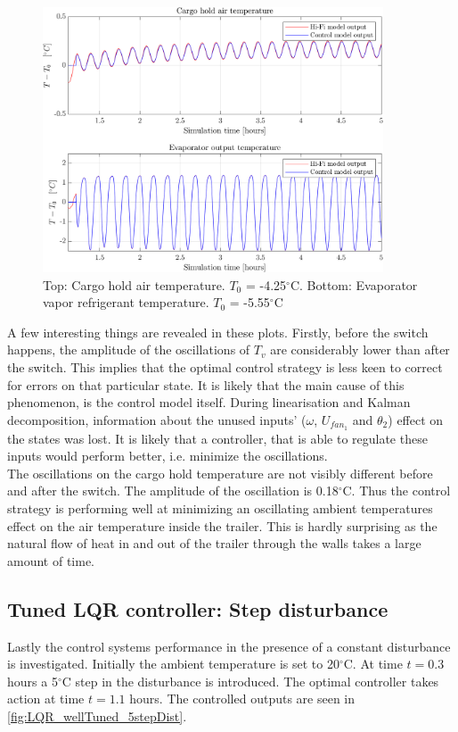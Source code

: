 \begin{figure}[h!]
	\centering
	\includegraphics[width=0.9\textwidth]{Graphics/fig_LQR_wellTuned_sineDist_zoom.png}
	\caption{Top: Cargo hold air temperature. $T_0$ = -4.25$^{\circ}$C. Bottom: Evaporator vapor refrigerant temperature. $T_0$ = -5.55$^{\circ}$C}
	\label{fig:LQR_wellTuned_sineDist_zoom}
\end{figure}

A few interesting things are revealed in these plots. Firstly, before the switch happens, the amplitude of the oscillations of $T_v$ are considerably lower than after the switch. This implies that the optimal control strategy is less keen to correct for errors on that particular state. It is likely that the main cause of this phenomenon, is the control model itself. During linearisation and Kalman decomposition, information about the unused inputs' ($\omega$, $U_{fan_1}$ and $\theta_2$) effect on the states was lost. It is likely that a controller, that is able to regulate these inputs would perform better, i.e. minimize the oscillations.\\

The oscillations on the cargo hold temperature are not visibly different before and after the switch. The amplitude of the oscillation is 0.18$^{\circ}$C. Thus the control strategy is performing well at minimizing an oscillating ambient temperatures effect on the air temperature inside the trailer. This is hardly surprising as the natural flow of heat in and out of the trailer through the walls takes a large amount of time. \\


\newpage
\subsection{Tuned LQR controller: Step disturbance}
Lastly the control systems performance in the presence of a constant disturbance is investigated. Initially the ambient temperature is set to 20$^{\circ}$C. At time $t=0.3$ hours a 5$^{\circ}$C step in the disturbance is introduced. The optimal controller takes action at time $t=1.1$ hours. The controlled outputs are seen in \cref{fig:LQR_wellTuned_5stepDist}.\\

